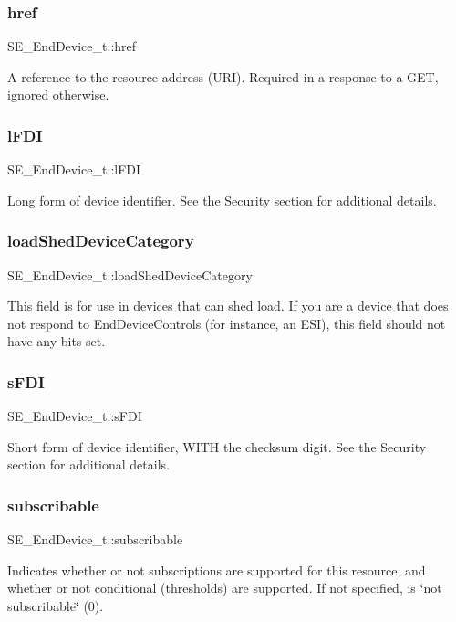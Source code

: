 \subsubsection{\texorpdfstring{href}{href}}
{\footnotesize\ttfamily S\+E\+\_\+\+End\+Device\+\_\+t\+::href}

A reference to the resource address (U\+RI). Required in a response to a G\+ET, ignored otherwise. \mbox{\label{group__EndDevice_gafe27205146aef10dbda86b098b9fac01}} 
\subsubsection{\texorpdfstring{l\+F\+DI}{lFDI}}
{\footnotesize\ttfamily S\+E\+\_\+\+End\+Device\+\_\+t\+::l\+F\+DI}

Long form of device identifier. See the Security section for additional details. \mbox{\label{group__EndDevice_ga3bf79be31f948539ab80cc7b0fc12930}} 
\subsubsection{\texorpdfstring{load\+Shed\+Device\+Category}{loadShedDeviceCategory}}
{\footnotesize\ttfamily S\+E\+\_\+\+End\+Device\+\_\+t\+::load\+Shed\+Device\+Category}

This field is for use in devices that can shed load. If you are a device that does not respond to End\+Device\+Controls (for instance, an E\+SI), this field should not have any bits set. \mbox{\label{group__EndDevice_ga710ce8285a63cf5f3b269ed0f2d92511}} 
\subsubsection{\texorpdfstring{s\+F\+DI}{sFDI}}
{\footnotesize\ttfamily S\+E\+\_\+\+End\+Device\+\_\+t\+::s\+F\+DI}

Short form of device identifier, W\+I\+TH the checksum digit. See the Security section for additional details. \mbox{\label{group__EndDevice_gaa4656eb793a41a2d41ddb4708c236471}} 
\subsubsection{\texorpdfstring{subscribable}{subscribable}}
{\footnotesize\ttfamily S\+E\+\_\+\+End\+Device\+\_\+t\+::subscribable}

Indicates whether or not subscriptions are supported for this resource, and whether or not conditional (thresholds) are supported. If not specified, is \char`\"{}not subscribable\char`\"{} (0). 